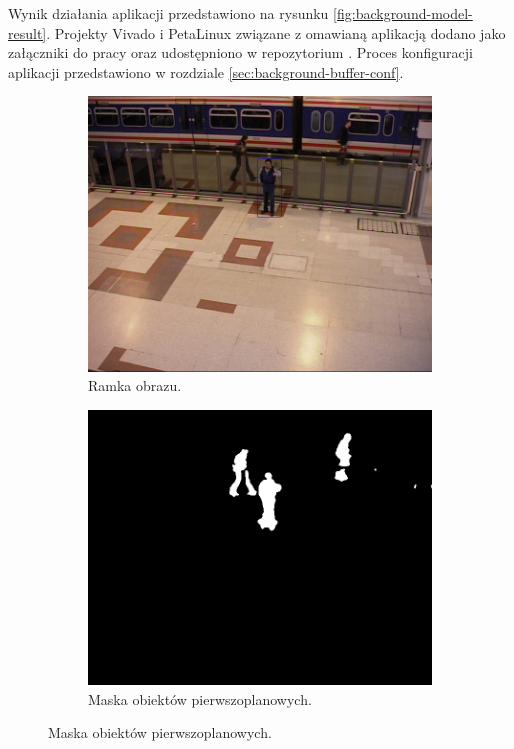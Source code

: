 Wynik działania aplikacji przedstawiono na rysunku \ref{fig:background-model-result}. Projekty Vivado i PetaLinux związane z omawianą aplikacją dodano jako załączniki do pracy oraz udostępniono w repozytorium \cite{git-repository}. Proces konfiguracji aplikacji przedstawiono w rozdziale \ref{sec:background-buffer-conf}.
\begin{figure}[H]
	\centering
	\begin{subfigure}[b]{0.49\textwidth}
		\includegraphics[width=\textwidth]{img/bg-input.png}
		\caption{Ramka obrazu.}
		\vspace{1ex}
	\end{subfigure}
	\hfill
	\begin{subfigure}[b]{0.49\textwidth}
		\includegraphics[width=\textwidth]{img/bg-fg.png}
		\caption{Maska obiektów pierwszoplanowych.}
		\vspace{1ex}
	\end{subfigure}


\end{figure}
